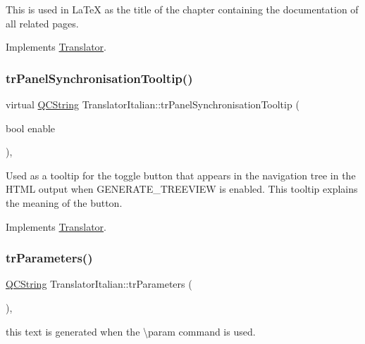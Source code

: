 This is used in La\+TeX as the title of the chapter containing the documentation of all related pages. 

Implements \mbox{\hyperlink{class_translator}{Translator}}.

\mbox{\label{class_translator_italian_a1e4a5f6c20c6d176fe9d13b9357f412e}} 
\subsubsection{\texorpdfstring{trPanelSynchronisationTooltip()}{trPanelSynchronisationTooltip()}}
{\footnotesize\ttfamily virtual \mbox{\hyperlink{class_q_c_string}{Q\+C\+String}} Translator\+Italian\+::tr\+Panel\+Synchronisation\+Tooltip (\begin{DoxyParamCaption}\item[{bool}]{enable }\end{DoxyParamCaption})\hspace{0.3cm}{\ttfamily [inline]}, {\ttfamily [virtual]}}

Used as a tooltip for the toggle button that appears in the navigation tree in the H\+T\+ML output when G\+E\+N\+E\+R\+A\+T\+E\+\_\+\+T\+R\+E\+E\+V\+I\+EW is enabled. This tooltip explains the meaning of the button. 

Implements \mbox{\hyperlink{class_translator}{Translator}}.

\mbox{\label{class_translator_italian_aea49d52a8a5fb2f7018bea9eb489f507}} 
\subsubsection{\texorpdfstring{trParameters()}{trParameters()}}
{\footnotesize\ttfamily \mbox{\hyperlink{class_q_c_string}{Q\+C\+String}} Translator\+Italian\+::tr\+Parameters (\begin{DoxyParamCaption}{ }\end{DoxyParamCaption})\hspace{0.3cm}{\ttfamily [inline]}, {\ttfamily [virtual]}}

this text is generated when the \textbackslash{}param command is used. 

